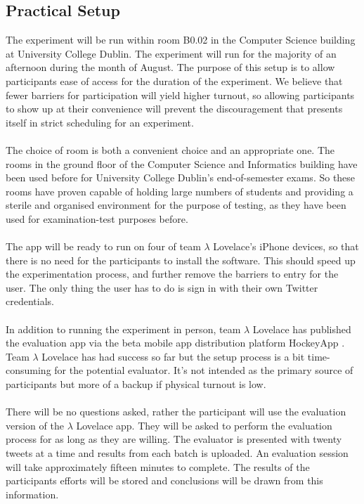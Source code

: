\documentclass{article}
\begin{document}
\subsection{Practical Setup}
%
%
The experiment will be run within room B0.02 in the Computer Science building at University College Dublin. The experiment will run for the majority of an afternoon during the month of August. The purpose of this setup is to allow participants ease of access for the duration of the experiment. We believe that fewer barriers for participation will yield higher turnout, so allowing participants to show up at their convenience will prevent the discouragement that presents itself in strict scheduling for an experiment. 
\\\\
The choice of room is both a convenient choice and an appropriate one. The rooms in the ground floor of the Computer Science and Informatics building have been used before for University College Dublin's end-of-semester exams. So these rooms have proven capable of holding large numbers of students and providing a sterile and organised environment for the purpose of testing, as they have been used for examination-test purposes before. 
\\\\
The app will be ready to run on four of team $\lambda$ Lovelace's iPhone devices, so that there is no need for the participants to install the software. This should speed up the experimentation process, and further remove the barriers to entry for the user. The only thing the user has to do is sign in with their own Twitter credentials.
\\\\
In addition to running the experiment in person, team $\lambda$ Lovelace has published the evaluation app via the beta mobile app distribution platform HockeyApp \cite{hockeyapp}. Team $\lambda$ Lovelace has had success so far but the setup process is a bit time-consuming for the potential evaluator. It's not intended as the primary source of participants but more of a backup if physical turnout is low.
\\\\
There will be no questions asked, rather the participant will use the evaluation version of the $\lambda$ Lovelace app. They will be asked to perform the evaluation process for as long as they are willing. The evaluator is presented with twenty tweets at a time and results from each batch is uploaded. An evaluation session will take approximately fifteen minutes to complete. The results of the participants efforts will be stored and conclusions will be drawn from this information.
\end{document}
